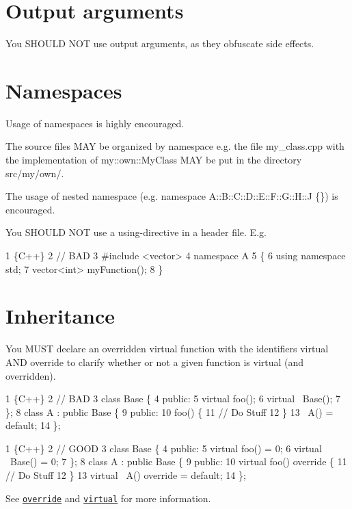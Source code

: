 \section*{Output arguments}

You S\+H\+O\+U\+LD N\+OT use output arguments, as they obfuscate side effects.

\section*{Namespaces}

Usage of namespaces is highly encouraged.

The source files M\+AY be organized by namespace e.\+g. the file {\ttfamily my\+\_\+class.\+cpp} with the implementation of {\ttfamily my\+::own\+::\+My\+Class} M\+AY be put in the directory {\ttfamily src/my/own/}.

The usage of nested namespace (e.\+g. {\ttfamily namespace A\+::\+B\+::\+C\+::\+D\+::\+E\+::\+F\+::\+G\+::\+H\+::J \{\}}) is encouraged.

You S\+H\+O\+U\+LD N\+OT use a using-\/directive in a header file. E.\+g. 
\begin{DoxyCode}
1 \{C++\}
2 // BAD
3 #include <vector>
4 namespace A
5 \{
6     using namespace std;
7     vector<int> myFunction();
8 \}
\end{DoxyCode}


\section*{Inheritance}

You M\+U\+ST declare an overridden virtual function with the identifiers {\ttfamily virtual} A\+ND {\ttfamily override} to clarify whether or not a given function is virtual (and overridden). 
\begin{DoxyCode}
1 \{C++\}
2 // BAD
3 class Base \{
4     public:
5     virtual foo();
6     virtual ~Base();
7 \};
8 class A : public Base \{
9     public:
10     foo() \{
11         // Do Stuff
12     \}
13     ~A() = default;
14 \};
\end{DoxyCode}
 
\begin{DoxyCode}
1 \{C++\}
2 // GOOD
3 class Base \{
4     public:
5     virtual foo() = 0;
6     virtual ~Base() = 0;
7 \};
8 class A : public Base \{
9     public:
10     virtual foo() override \{
11         // Do Stuff
12     \}
13     virtual ~A() override = default;
14 \};
\end{DoxyCode}
 See \href{https://en.cppreference.com/w/cpp/language/override}{\tt override} and \href{https://en.cppreference.com/w/cpp/language/virtual}{\tt virtual} for more information.

